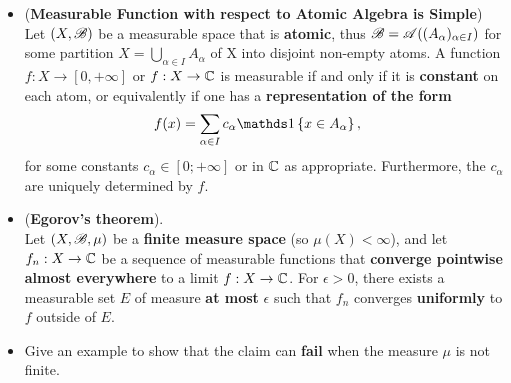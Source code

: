 \documentclass[11pt]{article}
\begin{document}
\begin{itemize}
\item \begin{proposition} (\textbf{Measurable Function with respect to Atomic Algebra is Simple})\\
Let $(X, {\mathscr B})$ be a measurable space that is \textbf{atomic}, thus ${\mathscr B} = {\mathscr A}((A_{\alpha})_{\alpha\in I})$ for some partition $X = \bigcup_{\alpha\in I}A_{\alpha}$ of X into disjoint non-empty atoms. A function $f : X \rightarrow [0,+\infty]$ or $f : X \rightarrow {\mathbb C}$ is measurable if and only if it is \textbf{constant} on each atom, or equivalently if one has a \textbf{representation of the form}
\begin{align*}
f(x)&= \sum_{\alpha \in I}c_{\alpha}\ind{x\in A_{\alpha}},
\end{align*} for some constants $c_{\alpha} \in [0;+\infty]$ or in ${\mathbb C}$ as appropriate. Furthermore, the $c_{\alpha}$ are uniquely determined by $f$.
\end{proposition}

\item \begin{theorem} (\textbf{Egorov's theorem}). \citep{tao2011introduction} \\
Let $(X, {\mathscr B}, \mu)$ be a \textbf{finite measure space} (so $\mu(X) < \infty$), and let $f_n : X \rightarrow {\mathbb C}$ be a sequence of measurable functions that \textbf{converge pointwise almost everywhere} to a limit $f : X \rightarrow {\mathbb C}$.  For $\epsilon > 0$, there exists a measurable set $E$ of measure \textbf{at most} $\epsilon$ such that $f_n$ converges \textbf{uniformly} to $f$ outside of $E$. 
\end{theorem}

\item \begin{remark}
Give an example to show that the claim can \textbf{fail} when the measure $\mu$ is not finite.
\end{remark}


\end{itemize}
\end{document}
